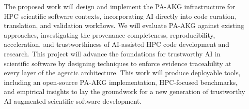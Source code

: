 The proposed work will design and implement the PA-AKG infrastructure for HPC scientific software contexts, incorporating AI directly into code curation, translation, and validation workflows. We will evaluate PA-AKG against existing approaches, investigating the provenance completeness, reproducibility, acceleration, and trustworthiness of AI-assisted HPC code development and research. This project will advance the foundations for trustworthy AI in scientific software by designing techniques to enforce evidence traceability at every layer of the agentic architecture. This work will produce deployable tools, including an open-source PA-AKG implementation, HPC-focused benchmarks, and empirical insights to lay the groundwork for a new generation of trustworthy AI-augmented scientific software development.
